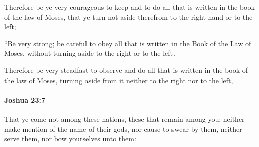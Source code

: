 			\begin{versebox}
					\item[BHS] 
					\item[ASV] Therefore be ye very courageous to keep and to do all that is written in the book of the law of Moses, that ye turn not aside therefrom to the right hand or to the left;
					\item[NIV] “Be very strong; be careful to obey all that is written in the Book of the Law of Moses, without turning aside to the right or to the left.
					\item[NRSV] Therefore be very steadfast to observe and do all that is written in the book of the law of Moses, turning aside from it neither to the right nor to the left,
			\end{versebox}

		\paragraph{Joshua 23:7} %
			\label{JOSHUA-23-7}

			That ye come not among these nations, these that remain among you; neither make mention of the name of their gods, nor cause to swear by them, neither serve them, nor bow yourselves unto them:


